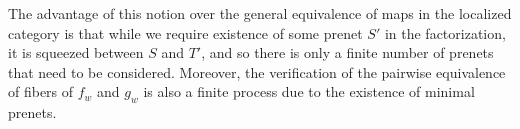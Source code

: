 \documentclass[letterpaper,12pt,leqno]{article}
\numberwithin{equation}{theorem}
\def\Int{\mathrm{Int}}
\def\lesub{\mathop{<}\limits}
\def\pless{\lesub^\circ}
\begin{document}
The advantage of this notion over the general equivalence of maps in the localized category is that while we
require existence of some prenet $S'$ in the factorization, it is squeezed between $S$ and $T'$, and so there is only a finite number of prenets that need to be considered. Moreover,
the verification of the pairwise equivalence of fibers of $f_w$ and $g_w$ is also a finite process due to the existence of minimal prenets.



\end{document}
